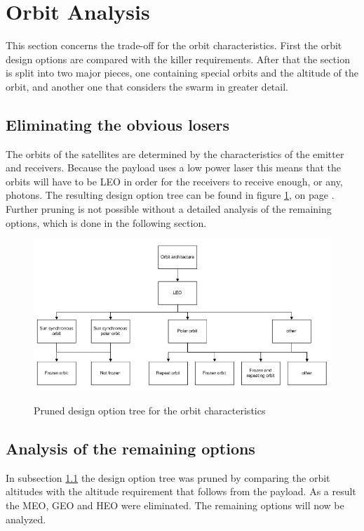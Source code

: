 \section{Orbit Analysis}
This section concerns the trade-off for the orbit characteristics. First the orbit design options are compared with the killer requirements. After that the section is split into two major pieces, one containing special orbits and the altitude of the orbit, and another one that considers the swarm in greater detail.
\label{AnalOrb}

\subsection{Eliminating the obvious losers}
\label{pruneOrbit}
The orbits of the satellites are determined by the characteristics of the emitter and receivers. Because the payload uses a low power laser this means that the orbits will have to be \ac{LEO} in order for the receivers to receive enough, or any, photons. The resulting design option tree can be found in figure \ref{fig:pruneOrbit}, on page \pageref{fig:pruneOrbit}. Further pruning is not possible without a detailed analysis of the remaining options, which is done in the following section.

\begin{figure}[b]
\centering
\includegraphics[width=1.0\textwidth, angle=0]{chapters/img/PrunedOrbit.jpg}
\label{fig:pruneOrbit}
\caption{Pruned design option tree for the orbit characteristics}
\end{figure}

\subsection{Analysis of the remaining options}
\label{AnalSpOrb}

In subsection \ref{pruneOrbit} the design option tree was pruned by comparing the orbit altitudes with the altitude requirement that follows from the payload. As a result the \acs{MEO}, \acs{GEO} and \acs{HEO} were eliminated. The remaining options will now be analyzed.

